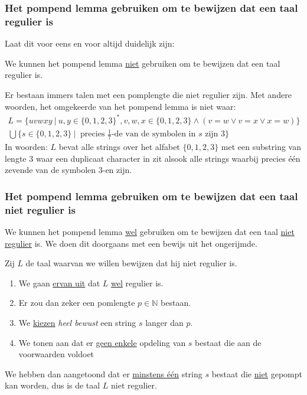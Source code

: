 \documentclass[main.tex]{subfiles}
\begin{document}
\subsubsection{Het pompend lemma gebruiken om te bewijzen dat een taal regulier is}
Laat dit voor eens en voor altijd duidelijk zijn:
\begin{center}
  We kunnen het pompend lemma \underline{niet} gebruiken om te bewijzen dat een taal regulier is.
\end{center}
Er bestaan immers talen met een pomplengte die niet regulier zijn.
Met andere woorden, het omgekeerde van het pompend lemma is niet waar:
\[ 
\begin{array}{c}
  L = \{ uvwxy\ |\ u,y \in \{0,1,2,3\}^{*}, v,w,x\in \{0,1,2,3\} \wedge (v=w \vee v=x \vee x=w)\}\\
  \bigcup \{ s \in \{0,1,2,3\}\ |\ \text{ precies } \frac{1}{7} \text{-de van de symbolen in } s \text{ zijn } 3 \}  
\end{array}
\]
In woorden: $L$ bevat alle strings over het alfabet $\{0,1,2,3\}$ met een substring van lengte $3$ waar een duplicaat character in zit alsook alle strings waarbij precies \'e\'en zevende van de symbolen $3$-en zijn.

\subsubsection{Het pompend lemma gebruiken om te bewijzen dat een taal niet regulier is}
We kunnen het pompend lemma \underline{wel} gebruiken om te bewijzen dat een taal \underline{niet regulier} is.
We doen dit doorgaans met een bewijs uit het ongerijmde.

Zij $L$ de taal waarvan we willen bewijzen dat hij niet regulier is.
\begin{enumerate}
\item We gaan \underline{ervan uit} dat $L$ \underline{wel} regulier is.
\item Er zou dan zeker een pomlengte $p\in \mathbb{N}$ bestaan.
\item We \underline{kiezen} \emph{heel bewust} een string $s$ langer dan $p$.
\item We tonen aan dat er \underline{geen enkele} opdeling van $s$ bestaat die aan de voorwaarden voldoet
\end{enumerate}
We hebben dan aangetoond dat er \underline{minstens \'e\'en} string $s$ bestaat die \underline{niet} gepompt kan worden, dus is de taal $L$ niet regulier.
\end{document}
